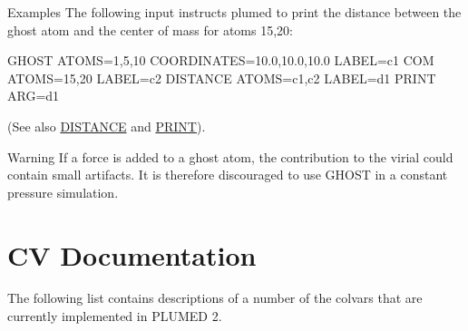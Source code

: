 \begin{DoxyParagraph}{Examples}
The following input instructs plumed to print the distance between the ghost atom and the center of mass for atoms 15,20\+: \begin{DoxyVerb}GHOST ATOMS=1,5,10 COORDINATES=10.0,10.0,10.0 LABEL=c1
COM ATOMS=15,20       LABEL=c2
DISTANCE ATOMS=c1,c2  LABEL=d1
PRINT ARG=d1
\end{DoxyVerb}
 (See also \hyperlink{DISTANCE}{D\+I\+S\+T\+A\+N\+C\+E} and \hyperlink{PRINT}{P\+R\+I\+N\+T}).
\end{DoxyParagraph}
\begin{DoxyWarning}{Warning}
If a force is added to a ghost atom, the contribution to the virial could contain small artifacts. It is therefore discouraged to use G\+H\+O\+S\+T in a constant pressure simulation. 
\end{DoxyWarning}
\hypertarget{Colvar}{}\section{C\+V Documentation}\label{Colvar}
The following list contains descriptions of a number of the colvars that are currently implemented in P\+L\+U\+M\+E\+D 2.

